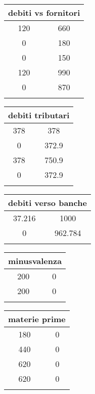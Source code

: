 \documentclass[twocolumn]{article}
\begin{document}
\begin{table}[ht]\centering 
\begin{tabular}{|c|c|}
\hline
\multicolumn{2}{|c|}{debiti vs fornitori} \\ 
\hline 120 & 660 \\ 
0 & 180 \\ 
0 & 150 \\ 
 \hline 
120 & 990 \\ 
\hline
0 & 870 \\ 
 \\ 
\hline
\end{tabular} \end{table} 
\begin{table}[ht]\centering 
\begin{tabular}{|c|c|}
\hline
\multicolumn{2}{|c|}{debiti tributari} \\ 
\hline 378 & 378 \\ 
0 & 372.9 \\ 
 \hline 
378 & 750.9 \\ 
\hline
0 & 372.9 \\ 
 \\ 
\hline
\end{tabular} \end{table} 
\begin{table}[ht]\centering 
\begin{tabular}{|c|c|}
\hline
\multicolumn{2}{|c|}{debiti verso banche} \\ 
\hline  \hline 
37.216 & 1000 \\ 
\hline
0 & 962.784 \\ 
 \\ 
\hline
\end{tabular} \end{table} 
\begin{table}[ht]\centering 
\begin{tabular}{|c|c|}
\hline
\multicolumn{2}{|c|}{minusvalenza} \\ 
\hline  \hline 
200 & 0 \\ 
\hline
200 & 0 \\ 
 \\ 
\hline
\end{tabular} \end{table} 
\begin{table}[ht]\centering 
\begin{tabular}{|c|c|}
\hline
\multicolumn{2}{|c|}{materie prime} \\ 
\hline 180 & 0 \\ 
440 & 0 \\ 
 \hline 
620 & 0 \\ 
\hline
620 & 0 \\ 
 \\ 
\hline
\end{tabular} \end{table} 
\end{document}
